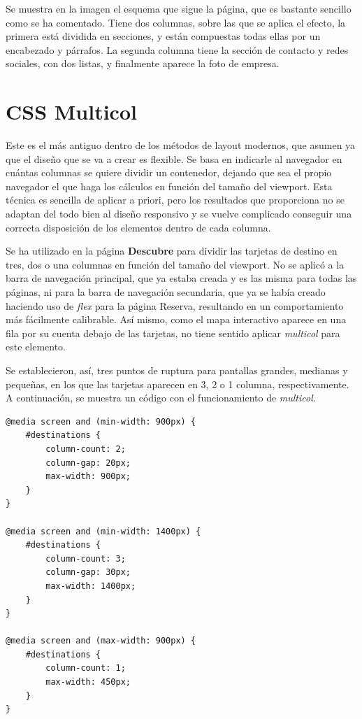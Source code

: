 \documentclass[11pt, a4paper]{book}
\begin{document}
	Se muestra en la imagen el esquema que sigue la página, que es bastante sencillo como se ha comentado. Tiene dos columnas, sobre las que se aplica el efecto, la primera está dividida en secciones, y están compuestas todas ellas por un encabezado y párrafos. La segunda columna tiene la sección de contacto y redes sociales, con dos listas, y finalmente aparece la foto de empresa.

	
	\section{CSS Multicol}

    Este es el más antiguo dentro de los métodos de layout modernos, que asumen ya que el diseño que se va a crear es flexible. Se basa en indicarle al navegador en cuántas columnas se quiere dividir un contenedor, dejando que sea el propio navegador el que haga los cálculos en función del tamaño del viewport. Esta técnica es sencilla de aplicar a priori, pero los resultados que proporciona no se adaptan del todo bien al diseño responsivo y se vuelve complicado conseguir una correcta disposición de los elementos dentro de cada columna.

    Se ha utilizado en la página \textbf{Descubre} para dividir las tarjetas de destino en tres, dos o una columnas en función del tamaño del viewport. No se aplicó a la barra de navegación principal, que ya estaba creada y es las misma para todas las páginas, ni para la barra de navegación secundaria, que ya se había creado haciendo uso de \textit{flex} para la página Reserva, resultando en un comportamiento más fácilmente calibrable. Así mismo, como el mapa interactivo aparece en una fila por su cuenta debajo de las tarjetas, no tiene sentido aplicar \textit{multicol} para este elemento.

    Se establecieron, así, tres puntos de ruptura para pantallas grandes, medianas y pequeñas, en los que las tarjetas aparecen en 3, 2 o 1 columna, respectivamente. A continuación, se muestra un código con el funcionamiento de \textit{multicol}.	

	\begin{lstlisting}[]
@media screen and (min-width: 900px) {
    #destinations {
        column-count: 2;
        column-gap: 20px;
        max-width: 900px;
    }
}

@media screen and (min-width: 1400px) {
    #destinations {
        column-count: 3;
        column-gap: 30px;
        max-width: 1400px;
    }
}

@media screen and (max-width: 900px) {
    #destinations {
        column-count: 1;
        max-width: 450px;
    }
}
	\end{lstlisting}
\end{document}
